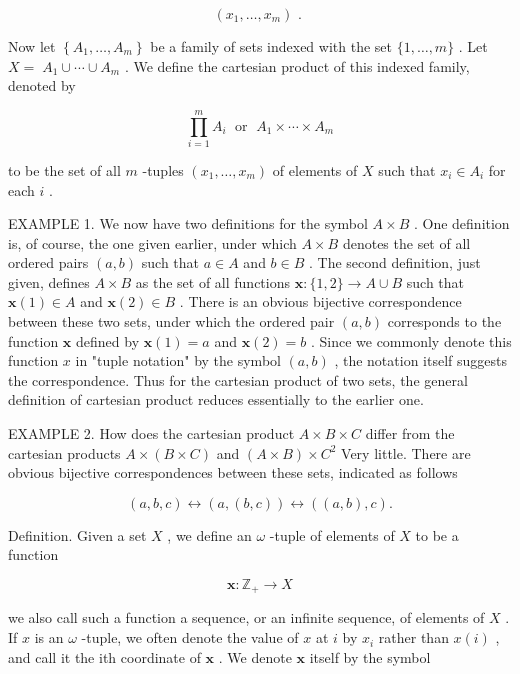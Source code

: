 \documentclass[10pt]{article}
\begin{document}
\[
\left( {{x}_{1},\ldots ,{x}_{m}}\right) \text{ . }
\]

Now let \(\left\{  {{A}_{1},\ldots ,{A}_{m}}\right\}\) be a family of sets indexed with the set \(\{ 1,\ldots ,m\}\) . Let \(X = \; {A}_{1} \cup  \cdots  \cup  {A}_{m}\) . We define the cartesian product of this indexed family, denoted by

\[
\mathop{\prod }\limits_{{i = 1}}^{m}{A}_{i}\;\text{ or }\;{A}_{1} \times  \cdots  \times  {A}_{m}
\]

to be the set of all \(m\) -tuples \(\left( {{x}_{1},\ldots ,{x}_{m}}\right)\) of elements of \(X\) such that \({x}_{i} \in  {A}_{i}\) for each \(i\) .

EXAMPLE 1. We now have two definitions for the symbol \(A \times  B\) . One definition is, of course, the one given earlier, under which \(A \times  B\) denotes the set of all ordered pairs \(\left( {a,b}\right)\) such that \(a \in  A\) and \(b \in  B\) . The second definition, just given, defines \(A \times  B\) as the set of all functions \(\mathbf{x} : \{ 1,2\}  \rightarrow  A \cup  B\) such that \(\mathbf{x}\left( 1\right)  \in  A\) and \(\mathbf{x}\left( 2\right)  \in  B\) . There is an obvious bijective correspondence between these two sets, under which the ordered pair \(\left( {a,b}\right)\) corresponds to the function \(\mathbf{x}\) defined by \(\mathbf{x}\left( 1\right)  = a\) and \(\mathbf{x}\left( 2\right)  = b\) . Since we commonly denote this function \(x\) in "tuple notation" by the symbol \(\left( {a,b}\right)\) , the notation itself suggests the correspondence. Thus for the cartesian product of two sets, the general definition of cartesian product reduces essentially to the earlier one.

EXAMPLE 2. How does the cartesian product \(A \times  B \times  C\) differ from the cartesian products \(A \times  \left( {B \times  C}\right)\) and \(\left( {A \times  B}\right)  \times  {C}^{2}\) Very little. There are obvious bijective correspondences between these sets, indicated as follows

\[
\left( {a,b,c}\right)  \leftrightarrow  \left( {a,\left( {b,c}\right) }\right)  \leftrightarrow  \left( {\left( {a,b}\right) ,c}\right) .
\]

Definition. Given a set \(X\) , we define an \(\omega\) -tuple of elements of \(X\) to be a function

\[
\mathbf{x} : {\mathbb{Z}}_{ + } \rightarrow  X
\]

we also call such a function a sequence, or an infinite sequence, of elements of \(X\) . If \(x\) is an \(\omega\) -tuple, we often denote the value of \(x\) at \(i\) by \({x}_{i}\) rather than \(x\left( i\right)\) , and call it the ith coordinate of \(\mathbf{x}\) . We denote \(\mathbf{x}\) itself by the symbol
\end{document}
